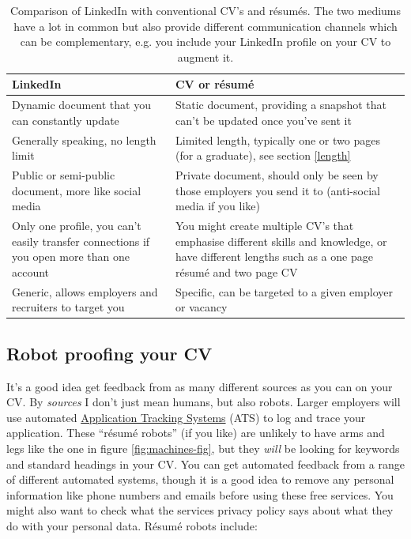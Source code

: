 \documentclass[
]{book}
\begin{document}
\begin{table}

\caption{\label{tab:linkedintable}Comparison of LinkedIn with conventional CV's and résumés. The two mediums have a lot in common but also provide different communication channels which can be complementary, e.g. you include your LinkedIn profile on your CV to augment it.}
\centering
\begin{tabular}[t]{ll}
\toprule
LinkedIn & CV or résumé\\
\midrule
Dynamic document that you can constantly update & Static document, providing a snapshot that can't be updated once you've  sent it\\
Generally speaking, no length limit & Limited length, typically one or two pages (for a graduate), see section \ref{length}\\
Public or semi-public document, more like social media & Private document, should only be seen by those employers you send it to (anti-social media if you like)\\
Only one profile, you can't easily transfer connections if you open more than one account & You might create multiple CV's that emphasise different skills and knowledge, or have different lengths such as a one page résumé and two page CV\\
Generic, allows employers and recruiters to target you & Specific, can be targeted to a given employer or vacancy\\
\bottomrule
\end{tabular}
\end{table}



\hypertarget{robotproof}{%
\subsection{Robot proofing your CV}\label{robotproof}}

It's a good idea get feedback from as many different sources as you can on your CV. By \emph{sources} I don't just mean humans, but also robots. Larger employers will use automated \href{https://en.wikipedia.org/wiki/Applicant_tracking_system}{Application Tracking Systems} (ATS) to log and trace your application. These ``résumé robots'' (if you like) are unlikely to have arms and legs like the one in figure \ref{fig:machines-fig}, but they \emph{will} be looking for keywords and standard headings in your CV. \citep{airesume} You can get automated feedback from a range of different automated systems, though it is a good idea to remove any personal information like phone numbers and emails before using these free services. You might also want to check what the services privacy policy says about what they do with your personal data. Résumé robots include:
\end{document}
